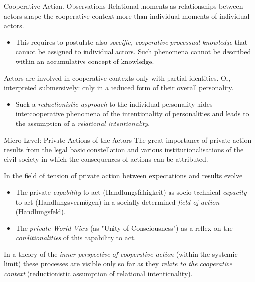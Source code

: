 \documentclass{beamer}
\begin{document}
\begin{frame}{Cooperative Action. Observations}
Relational moments as relationships between actors shape the cooperative
context more than individual moments of individual actors.\vspace{-1em}
\begin{itemize}
\item This requires to postulate also \emph{specific, cooperative processual
  knowledge} that cannot be assigned to individual actors. Such phenomena
  cannot be described within an accumulative concept of knowledge.
\end{itemize}
Actors are involved in cooperative contexts only with partial identities. Or,
interpreted submersively: only in a reduced form of their overall personality.
\vspace{-1em}
\begin{itemize}
\item Such a \emph{reductionistic approach} to the individual personality
  hides intercooperative phenomena of the intentionality of personalities and
  leads to the assumption of a \emph{relational intentionality}.
\end{itemize}
\end{frame}

\begin{frame}{Micro Level: Private Actions of the Actors}
The great importance of private action results from the legal basic
constellation and various institutionalisations of the civil society in which
the consequences of actions can be attributed.

In the field of tension of private action between expectations and results
evolve\vspace{-1em}
\begin{itemize}
\item The private \emph{capability} to act (Handlungsfähigkeit) as
  socio-technical \emph{capacity} to act (Handlungsvermögen) in a socially
  determined \emph{field of action} (Handlungsfeld).
\item The \emph{private World View} (as "Unity of Consciousness") as a reflex
  on the \emph{conditionalities} of this capability to act.
\end{itemize}\vspace{-1em}
In a theory of the \emph{inner perspective of cooperative action} (within the
systemic limit) these processes are visible only so far as they \emph{relate
  to the cooperative context} (reductionistic assumption of relational
intentionality).
\end{frame}
\end{document}
